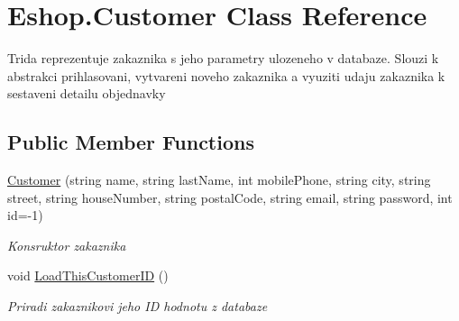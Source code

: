 \hypertarget{class_eshop_1_1_customer}{}\section{Eshop.\+Customer Class Reference}
\label{class_eshop_1_1_customer}


Trida reprezentuje zakaznika s jeho parametry ulozeneho v databaze. Slouzi k abstrakci prihlasovani, vytvareni noveho zakaznika a vyuziti udaju zakaznika k sestaveni detailu objednavky  


\subsection*{Public Member Functions}
\begin{DoxyCompactItemize}
\item 
\mbox{\hyperlink{class_eshop_1_1_customer_a3669e0d15cd58f46f81b9b22153feb9f}{Customer}} (string name, string last\+Name, int mobile\+Phone, string city, string street, string house\+Number, string postal\+Code, string email, string password, int id=-\/1)
\begin{DoxyCompactList}\small\item\em Konsruktor zakaznika \end{DoxyCompactList}\item 
void \mbox{\hyperlink{class_eshop_1_1_customer_aabd2fbc8a9b8353e07fb7ad191464ef1}{Load\+This\+Customer\+ID}} ()
\begin{DoxyCompactList}\small\item\em Priradi zakaznikovi jeho ID hodnotu z databaze \end{DoxyCompactList}\end{DoxyCompactItemize}
